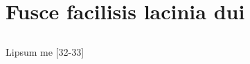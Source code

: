 

\chapter{Fusce facilisis lacinia dui}

\showfont
\section[Some encoding tests]{\showfont}
\subsection{\showfont}
\subsubsection{\showfont}
\subsubsubsection{\showfont}



Lipsum me [32-33]


